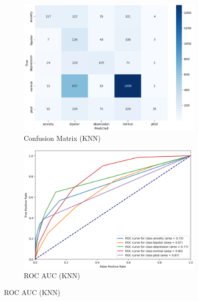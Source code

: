\begin{figure}[h!]
    \centering
    \begin{subfigure}[b]{0.49\textwidth}
        \centering
        \includegraphics[width=\textwidth]{Images/KNN Confusion Matrix.png}
        \caption*{Confusion Matrix (KNN)}
        \label{KNNCM}  %
    \end{subfigure}
    \hfill
    \begin{subfigure}[b]{0.49\textwidth}
        \centering
        \includegraphics[width=\textwidth]{Images/KNN ROC.png}
        \caption*{ROC AUC (KNN)}
        \label{KNNROC}  %
    \end{subfigure}
    \label{fig:knn_comparison}
\end{figure}

